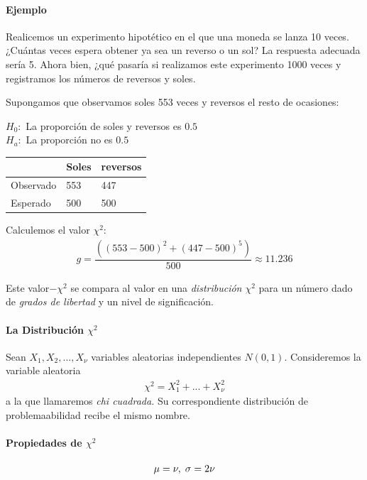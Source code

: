 \paragraph{Ejemplo}
Realicemos un experimento hipotético en el que una moneda se lanza 10 veces. ¿Cuántas veces espera obtener ya sea un reverso o un sol?  La respuesta adecuada sería 5.  Ahora bien, ¿qué pasaría si realizamos este experimento 1000 veces y registramos los números de reversos y soles.


Supongamos que observamos soles 553 veces y reversos el resto de ocasiones:
\begin{center}
 $H_{0}:$ La proporción de soles y reversos es $0.5$ \\
 $H_{a}:$ La proporción no es $0.5$
\end{center}



\begin{center}
\begin{tabular}{|l|l|l|}\hline
 & Soles & reversos\\\hline
Observado & 553 & 447\\\hline
Esperado & 500 & 500\\\hline
\end{tabular}
\end{center}


Calculemos el valor $\chi^{2}:$
\begin{align}
 g = \dfrac{\left( \left( 553-500 \right)^{2}+\left( 447-500 \right)^{5} \right)}{500}\approx 11.236
\end{align}



Este valor$-\chi^{2}$ se compara al valor en una \emph{distribución $\chi^{2}$} para un número dado de \emph{grados de libertad} y un nivel de significación.

\paragraph{La Distribución $\chi^{2}$}
Sean $X_{1},X_{2},...,X_{\nu}$ variables aleatorias independientes $N(0,1).$
 Consideremos la variable aleatoria
\begin{align}
 \label{outline:19}
 \chi^{2}=X_{1}^{2}+...+X_{\nu}^{2}
\end{align}
a la que llamaremos \emph{chi cuadrada.} Su correspondiente distribución de problemaabilidad recibe el mismo nombre.

\paragraph{Propiedades de $\chi^{2}$}
\begin{align}
 \label{eq:22}
 \mu=\nu, \; \sigma = 2\nu
\end{align}


